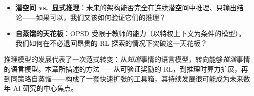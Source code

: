 \begin{questionbox}[RL 用于推理中的开放问题]
\begin{itemize}
  \item \textbf{潜空间 vs.\ 显式推理}：未来的架构能否完全在连续潜空间中推理、只输出结论——如果可以，我们又该如何验证它们的推理？
  \item \textbf{自蒸馏的天花板}：OPSD 受限于教师的能力（以特权上下文为条件的模型）。我们如何在不必退回昂贵的 RL 探索的情况下突破这一天花板？
\end{itemize}
\end{questionbox}

推理模型的发展代表了一次范式转变：从\emph{知道}事情的语言模型，转向能够\emph{推演}事情的语言模型。本章所描述的方法——从可验证奖励的 RL，到推理时算力扩展，再到同策略自蒸馏——构成了一套快速扩张的工具箱，其持续发展很可能成为未来数年 AI 研究的中心焦点。
